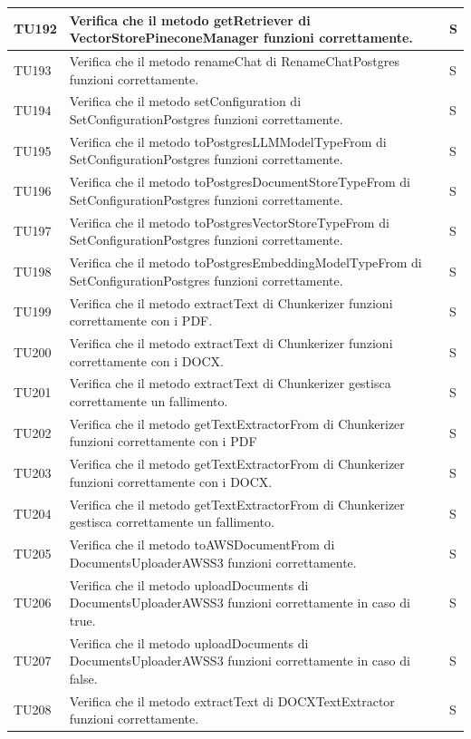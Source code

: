 \documentclass[10pt, a4paper]{article}
\begin{document}
\begin{xltabular}{\textwidth}{p{0.12\textwidth}|p{0.7\textwidth}|X}
\hline
TU192 & Verifica che il metodo getRetriever di VectorStorePineconeManager funzioni correttamente. & S \\
\hline
TU193 & Verifica che il metodo renameChat di RenameChatPostgres funzioni correttamente. & S \\
\hline
TU194 & Verifica che il metodo setConfiguration di SetConfigurationPostgres funzioni correttamente. & S \\
\hline
TU195 & Verifica che il metodo toPostgresLLMModelTypeFrom di SetConfigurationPostgres funzioni correttamente. & S \\
\hline
TU196 & Verifica che il metodo toPostgresDocumentStoreTypeFrom di SetConfigurationPostgres funzioni correttamente. & S \\
\hline
TU197 & Verifica che il metodo toPostgresVectorStoreTypeFrom di SetConfigurationPostgres funzioni correttamente. & S \\
\hline
TU198 & Verifica che il metodo toPostgresEmbeddingModelTypeFrom di SetConfigurationPostgres funzioni correttamente. & S \\
\hline
TU199 & Verifica che il metodo extractText di Chunkerizer funzioni correttamente con i PDF. & S \\
\hline
TU200 & Verifica che il metodo extractText di Chunkerizer funzioni correttamente con i DOCX. & S \\
\hline
TU201 & Verifica che il metodo extractText di Chunkerizer gestisca correttamente un fallimento. & S \\
\hline
TU202 & Verifica che il metodo getTextExtractorFrom di Chunkerizer funzioni correttamente con i PDF& S \\
\hline
TU203 & Verifica che il metodo getTextExtractorFrom di Chunkerizer funzioni correttamente con i DOCX. & S \\
\hline
TU204 & Verifica che il metodo getTextExtractorFrom di Chunkerizer gestisca correttamente un fallimento. & S \\
\hline
TU205 & Verifica che il metodo toAWSDocumentFrom di DocumentsUploaderAWSS3 funzioni correttamente. & S \\
\hline
TU206 & Verifica che il metodo uploadDocuments di DocumentsUploaderAWSS3 funzioni correttamente in caso di true. & S \\
\hline
TU207 & Verifica che il metodo uploadDocuments di DocumentsUploaderAWSS3 funzioni correttamente in caso di false. & S \\
\hline
TU208 & Verifica che il metodo extractText di DOCXTextExtractor funzioni correttamente. & S \\

\end{xltabular}
\end{document}

